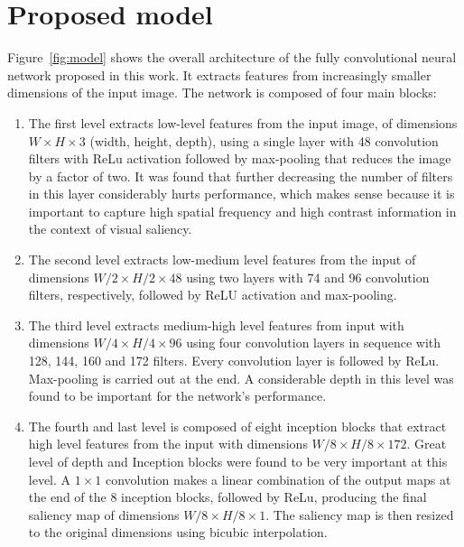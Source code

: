 \documentclass[10pt,twocolumn,letterpaper]{article}
\begin{document}
\section{Proposed model}
Figure~\ref{fig:model} shows the overall architecture of the fully
convolutional neural network proposed in this work.
It extracts features from increasingly smaller dimensions of the
input image.
The network is composed of four main blocks:

\begin{enumerate}
    \item The first level extracts low-level features from the input image, of
        dimensions $W\times H \times 3$ (width, height, depth), using
        a single layer with 48 convolution filters with ReLu activation
        followed by max-pooling that reduces the image by a factor of two.
        It was found that further decreasing the number of filters in this
        layer considerably hurts performance, which makes sense because it is
        important to capture high spatial frequency and high contrast
        information in the context of visual saliency.
    \item The second level extracts low-medium level features from the
        input of dimensions $W/2 \times H/2 \times 48$ using two layers
        with 74 and 96 convolution filters, respectively, followed by ReLU
        activation and max-pooling.
    \item The third level extracts medium-high level features from input with
        dimensions $W/4 \times H/4 \times 96$ using four convolution layers
        in sequence with 128, 144, 160 and 172 filters.
        Every convolution layer is followed by ReLu.
        Max-pooling is carried out at the end.
        A considerable depth in this level was found to be important for
        the network's performance.
    \item The fourth and last level is composed of eight inception blocks
        that extract high level features from the input with
        dimensions $W/8 \times H/8 \times 172$.
        Great level of depth and Inception blocks were found to be very
        important at this level.
        A $1 \times 1$ convolution makes a linear combination of the output
        maps at the end of the 8 inception blocks, followed by ReLu, producing
        the final saliency map of dimensions $W/8 \times H/8 \times 1$.
        The saliency map is then resized to the original dimensions using
        bicubic interpolation.
\end{enumerate}
\end{document}
